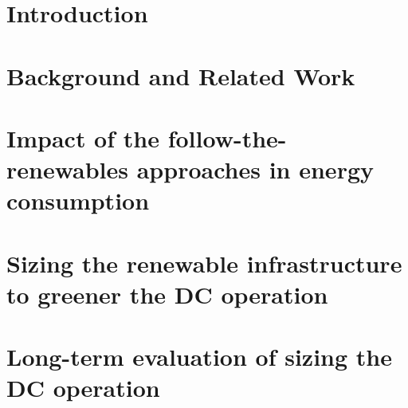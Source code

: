 
\chapter{Introduction} 
\label{chap:intro}





\chapter{Background and Related Work}
\label{chap:background}





\chapter[Impact of the follow-the-renewables approaches in energy consumption]{Impact of the follow-the-renewables approaches in energy consumption}
\label{chap:smartgreens}





\chapter[Sizing the renewable infrastructure to greener the DC operation]{Sizing the renewable infrastructure to greener the DC operation}
\label{chap:ccgrid}







\chapter[Long-term evaluation of sizing the DC operation]{Long-term evaluation of sizing the DC operation}
\label{chap:ccgrid-extension}


